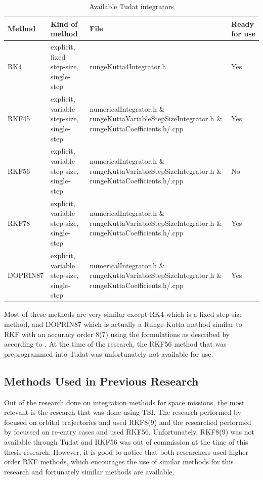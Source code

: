 \begin{table}[H]
\begin{center}
\caption{Available \ac{Tudat} integrators \citep{dirkx2016tudat}}
\label{tab:tudatIntegrators}
\begin{tabular}{|l|p{4cm}|p{8cm}|l|}
\hline 
\textbf{Method} & \textbf{Kind of method}		& \textbf{File} & \textbf{Ready for use} \\ \hline \hline
\ac{RK4} 	& explicit, fixed step-size, single-step & rungeKutta4Integrator.h & Yes  \\ \hline
\ac{RKF45} 	& explicit,  variable step-size, single-step & numericalIntegrator.h \& rungeKuttaVariableStepSizeIntegrator.h
\& rungeKuttaCoefficients.h/.cpp &  Yes \\ \hline
\acs{RKF56} 	& explicit, variable step-size, single-step & numericalIntegrator.h \& rungeKuttaVariableStepSizeIntegrator.h
\& rungeKuttaCoefficients.h/.cpp & No  \\ \hline
\ac{RKF78} &	explicit, variable step-size, single-step & numericalIntegrator.h \& rungeKuttaVariableStepSizeIntegrator.h
\& rungeKuttaCoefficients.h/.cpp &  Yes \\ \hline
\acs{DOPRIN87} 	& explicit, variable step-size, single-step & numericalIntegrator.h \& rungeKuttaVariableStepSizeIntegrator.h
\& rungeKuttaCoefficients.h/.cpp & Yes  \\ \hline
 	
 		
\end{tabular}
\end{center}
\end{table}

\noindent
Most of these methods are very similar except \ac{RK4} which is a fixed step-size method, and \ac{DOPRIN87} which is actually a Runge-Kutta method similar to \ac{RKF} with an accuracy order 8(7) using the formulations as described by \cite{prince1981high} according to \cite{weeks2007comparison}. At the time of the research, the \ac{RKF56} method that was preprogrammed into \ac{Tudat} was unfortunately not available for use.

\subsection{Methods Used in Previous Research}
\label{subsec:methodsUsedInPreviousResearch}
Out of the research done on integration methods for space missions, the most relevant is the research that was done using \ac{TSI}. The research performed by \cite{scott2008high} focused on orbital trajectories and used RKF8(9) and the researched performed by \cite{bergsma2016application} focussed on re-entry cases and used \ac{RKF56}. Unfortunately, RKF8(9) was not available through \ac{Tudat} and \ac{RKF56} was out of commission at the time of this thesis research. However, it is good to notice that both researchers used higher order RKF methods, which encourages the use of similar methods for this research and fortunately similar methods are available.

